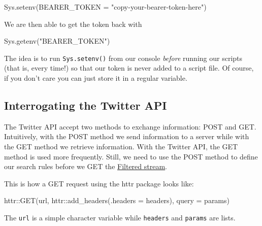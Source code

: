 \documentclass[
]{article}
\newenvironment{Shaded}{\begin{snugshade}}{\end{snugshade}}
\newcommand{\AttributeTok}[1]{\textcolor[rgb]{0.77,0.63,0.00}{#1}}
\newcommand{\FunctionTok}[1]{\textcolor[rgb]{0.00,0.00,0.00}{#1}}
\newcommand{\NormalTok}[1]{#1}
\newcommand{\SpecialCharTok}[1]{\textcolor[rgb]{0.00,0.00,0.00}{#1}}
\newcommand{\StringTok}[1]{\textcolor[rgb]{0.31,0.60,0.02}{#1}}
\begin{document}
\begin{Shaded}
\begin{Highlighting}[]
\FunctionTok{Sys.setenv}\NormalTok{(}\AttributeTok{BEARER\_TOKEN =} \StringTok{"copy{-}your{-}bearer{-}token{-}here"}\NormalTok{)}
\end{Highlighting}
\end{Shaded}

We are then able to get the token back with

\begin{Shaded}
\begin{Highlighting}[]
\FunctionTok{Sys.getenv}\NormalTok{(}\StringTok{"BEARER\_TOKEN"}\NormalTok{)}
\end{Highlighting}
\end{Shaded}

The idea is to run \texttt{Sys.setenv()} from our console \emph{before} running our scripts (that is, every time!) so that our token is never added to a script file. Of course, if you don't care you can just store it in a regular variable.

\hypertarget{interrogating-the-twitter-api}{%
\subsection{Interrogating the Twitter API}\label{interrogating-the-twitter-api}}

The Twitter API accept two methods to exchange information: POST and GET. Intuitively, with the POST method we send information to a server while with the GET method we retrieve information. With the Twitter API, the GET method is used more frequently. Still, we need to use the POST method to define our search rules before we GET the \href{https://developer.twitter.com/en/docs/twitter-api/tweets/filtered-stream/introduction}{Filtered stream}.

This is how a GET request using the httr package looks like:

\begin{Shaded}
\begin{Highlighting}[]
\NormalTok{httr}\SpecialCharTok{::}\FunctionTok{GET}\NormalTok{(url,}
\NormalTok{          httr}\SpecialCharTok{::}\FunctionTok{add\_headers}\NormalTok{(}\AttributeTok{.headers =}\NormalTok{ headers),}
          \AttributeTok{query =}\NormalTok{ params)}
\end{Highlighting}
\end{Shaded}

The \texttt{url} is a simple character variable while \texttt{headers} and \texttt{params} are lists.
\end{document}
